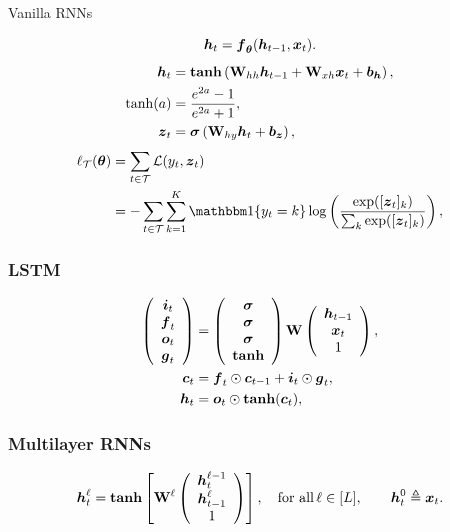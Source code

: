 \documentclass[presentation]{beamer}
\begin{document}
\begin{frame}{Vanilla RNNs}
    
    \begin{equation}
        \text{\boldmath $h$}_t = \text{\boldmath $f$}_{\text{\boldmath $\theta$}}(\text{\boldmath $h$}_{t-1}, \text{\boldmath $x$}_t).
    \end{equation}
    \pause
    \begin{align}
        \text{\boldmath $h$}_t  &= \mathrm{\textbf{tanh}}\left( \mathrm{\bf W}_{hh} \text{\boldmath $h$}_{t-1}+ \mathrm{\bf W}_{xh} \text{\boldmath $x$}_t + \text{\boldmath $b$}_{\text{\boldmath $h$}} \right), \\
        \tanh(a) &= \frac{e^{2a} - 1}{e^{2a} + 1}, \\
        \text{\boldmath $z$}_t &= \bm{\sigma} \left(\mathrm{\bf W}_{hy} \text{\boldmath $h$}_t + \text{\boldmath $b$}_{\text{\boldmath $z$}} \right),
    \end{align}
    \pause
    \begin{equation}
        \begin{aligned}
            \ell_{\cT}(\btheta) &= \sum_{t \in \cT} \cL(y_t, \zz_t) \\
             &= - \sum_{t \in \cT} \sum_{k=1}^K \bbone\{y_t = k\} \log \left( \frac{\exp([\zz_t]_k)}{\sum_k \exp([\zz_t]_k)} \right),
        \end{aligned}
    \end{equation}
\end{frame}

\begin{frame}
    \frametitle{LSTM}
    \begin{align}
        \left( \begin{array}{c} \text{\boldmath $i$}_t \\ \text{\boldmath $f$}_t \\ \text{\boldmath $o$}_t \\ \text{\boldmath $g$}_t \end{array} \right) &= \left( \begin{array}{c} \bm{\sigma} \\ \bm{\sigma} \\ \bm{\sigma} \\ \mathrm{\textbf{tanh}} \end{array} \right) \mathrm{\bf W} \left( \begin{array}{c} \text{\boldmath $h$}_{t-1} \\ \text{\boldmath $x$}_t \\ 1 \end{array} \right), \\
        \text{\boldmath $c$}_t &= \text{\boldmath $f$}_t \odot \text{\boldmath $c$}_{t-1} + \text{\boldmath $i$}_t \odot \text{\boldmath $g$}_t, \\
        \text{\boldmath $h$}_t &= \text{\boldmath $o$}_t \odot \mathrm{\textbf{tanh}}(\text{\boldmath $c$}_t),
    \end{align}
\end{frame}

\begin{frame}
    \frametitle{Multilayer RNNs}
    
    \begin{equation}
        \text{\boldmath $h$}_t^{\ell} =  \mathrm{\textbf{tanh}} \left[\mathrm{\bf W}^\ell \left( \begin{array}{c} \text{\boldmath $h$}_t^{\ell-1} \\ \text{\boldmath $h$}_{t-1}^\ell \\ 1 \end{array} \right) \right], \quad \text{for all}\, \ell \in [L], \qquad \text{\boldmath $h$}_t^{0} \triangleq \text{\boldmath $x$}_t.
    \end{equation}

\end{frame}
\end{document}
